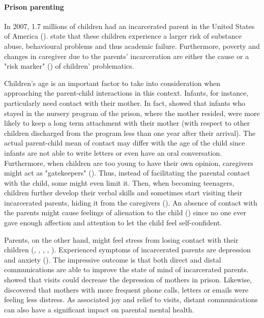 \vspace{4pt}
\paragraph{Prison parenting}
In 2007, 1.7 millions of children had an incarcerated parent in the United States of America (\cite{glaze2008parents}). \textcite{poehlmann2010children} state that these children experience a larger risk of substance abuse, behavioural problems and thus academic failure. Furthermore, poverty and changes in caregiver due to the parents' incarceration are either the cause or a "risk marker" (\cite{murray2008effects}) of children' problematics. 

Children's age is an important factor to take into consideration when approaching the parent-child interactions in this context. Infants, for instance, particularly need contact with their mother. In fact, \textcite{byrne2010intergenerational} showed that infants who stayed in the nursery program of the prison, where the mother resided, were more likely to keep a long term attachment with their mother (with respect to other children discharged from the program less than one year after their arrival). The actual parent-child mean of contact may differ with the age of the child since infants are not able to write letters or even have an oral conversation. Furthermore, when children are too young to  have their own opinion, caregivers might act as "gatekeepers" (\cite{enos2001mothering}). Thus, instead of facilitating the parental contact with the child, some might even limit it. Then, when becoming teenagers, children further develop their verbal skills and sometimes start visiting their incarcerated parents, hiding it from the caregivers (\cite{shlafer2010attachment}). An absence of contact with the parents might cause feelings of alienation to the child (\cite{shlafer2010attachment}) since no one ever gave enough affection and attention to let the child feel self-confident.

Parents, on the other hand, might feel stress from losing contact with their children (\cite{day2005incarcerated}, \cite{clarke2005fathering}, \cite{magaletta2001fathering}, \cite{roy2005gatekeeping}, \cite{arditti2008maternal}). Experienced symptoms of incarcerated parents are depression and anxiety (\cite{houck2002relationship}). The impressive outcome is that both direct and distal communications are able to improve the state of mind of incarcerated parents. \textcite{poehlmann2005incarcerated} showed that visits could decrease the depression of mothers in prison. Likewise, \textcite{loper2009parenting} discovered that mothers with more frequent phone calls, letters or emails were feeling less distress. As \textcite{casey2004children} associated joy and relief to visits, distant communications can also have a significant impact on parental mental health.

